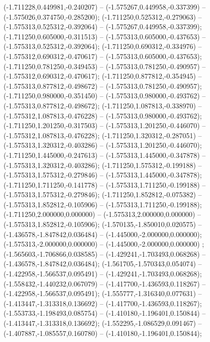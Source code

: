  (-1.711228,0.449981,-0.240207) -- (-1.575267,0.449958,-0.337399) -- (-1.575026,0.374750,-0.285200);
 (-1.711250,0.525312,-0.279063) -- (-1.575313,0.525312,-0.392064) -- (-1.575267,0.449958,-0.337399);
 (-1.711250,0.605000,-0.311513) -- (-1.575313,0.605000,-0.437653) -- (-1.575313,0.525312,-0.392064);
 (-1.711250,0.690312,-0.334976) -- (-1.575312,0.690312,-0.470617) -- (-1.575313,0.605000,-0.437653);
 (-1.711250,0.781250,-0.349453) -- (-1.575313,0.781250,-0.490957) -- (-1.575312,0.690312,-0.470617);
 (-1.711250,0.877812,-0.354945) -- (-1.575313,0.877812,-0.498672) -- (-1.575313,0.781250,-0.490957);
 (-1.711250,0.980000,-0.351450) -- (-1.575313,0.980000,-0.493762) -- (-1.575313,0.877812,-0.498672);
 (-1.711250,1.087813,-0.338970) -- (-1.575312,1.087813,-0.476228) -- (-1.575313,0.980000,-0.493762);
 (-1.711250,1.201250,-0.317503) -- (-1.575313,1.201250,-0.446070) -- (-1.575312,1.087813,-0.476228);
 (-1.711250,1.320312,-0.287051) -- (-1.575313,1.320312,-0.403286) -- (-1.575313,1.201250,-0.446070);
 (-1.711250,1.445000,-0.247613) -- (-1.575313,1.445000,-0.347878) -- (-1.575313,1.320312,-0.403286);
 (-1.711250,1.575312,-0.199188) -- (-1.575313,1.575312,-0.279846) -- (-1.575313,1.445000,-0.347878);
 (-1.711250,1.711250,-0.141778) -- (-1.575313,1.711250,-0.199188) -- (-1.575313,1.575312,-0.279846);
 (-1.711250,1.852812,-0.075382) -- (-1.575313,1.852812,-0.105906) -- (-1.575313,1.711250,-0.199188);
 (-1.711250,2.000000,0.000000) -- (-1.575313,2.000000,0.000000) -- (-1.575313,1.852812,-0.105906);
 (-1.570135,-1.850010,0.020575) -- (-1.436578,-1.847842,0.036484) -- (-1.445000,-2.000000,0.000000);
 (-1.575313,-2.000000,0.000000) -- (-1.445000,-2.000000,0.000000) ;
 (-1.565603,-1.706866,0.038585) -- (-1.429241,-1.703493,0.068268) -- (-1.436578,-1.847842,0.036484);
 (-1.561705,-1.570343,0.054074) -- (-1.422958,-1.566537,0.095491) -- (-1.429241,-1.703493,0.068268);
 (-1.558432,-1.440232,0.067079) -- (-1.417700,-1.436593,0.118267) -- (-1.422958,-1.566537,0.095491);
 (-1.555777,-1.316340,0.077631) -- (-1.413447,-1.313318,0.136692) -- (-1.417700,-1.436593,0.118267);
 (-1.553733,-1.198493,0.085754) -- (-1.410180,-1.196401,0.150844) -- (-1.413447,-1.313318,0.136692);
 (-1.552295,-1.086529,0.091467) -- (-1.407887,-1.085557,0.160780) -- (-1.410180,-1.196401,0.150844);
